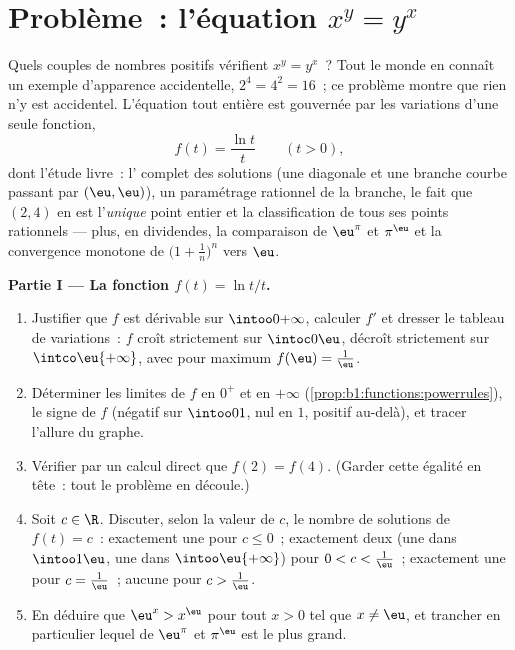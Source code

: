 \section{Problème~: l'équation $x^y = y^x$}

\begin{problem}\label{pb:b1:functions:1}
Quels couples de nombres positifs vérifient $x^y = y^x$~? Tout le
monde en connaît un exemple d'apparence accidentelle, $2^4 = 4^2 =
16$~; ce problème montre que rien n'y est accidentel. L'équation tout
entière est gouvernée par les variations d'une seule fonction,
\[
f(t) = \frac{\ln t}{t} \qquad (t > 0),
\]
dont l'étude livre~: l' complet des solutions (une diagonale
et une branche courbe passant par $(\eu, \eu)$), un paramétrage
rationnel de la branche, le fait que $(2, 4)$ en est l'\emph{unique}
point entier et la classification de tous ses points rationnels ---
plus, en dividendes, la comparaison de $\eu^\pi$ et $\pi^\eu$ et la
convergence monotone de $\bigl(1 + \frac1n\bigr)^n$ vers $\eu$.

\medskip
\noindent\textbf{Partie I --- La fonction $f(t) = \ln t / t$.}
\begin{enumerate}
  \item Justifier que $f$ est dérivable sur $\intoo0{+\infty}$,
        calculer $f'$ et dresser le tableau de variations~: $f$
        croît strictement sur $\intoc0\eu$, décroît strictement sur
        $\intco\eu{+\infty}$, avec pour maximum $f(\eu) = \frac1\eu$.
  \item Déterminer les limites de $f$ en $0^+$ et en $+\infty$
        (\cref{prop:b1:functions:powerrules}), le signe de $f$
        (négatif sur $\intoo01$, nul en $1$, positif au-delà), et
        tracer l'allure du graphe.
  \item Vérifier par un calcul direct que $f(2) = f(4)$. (Garder
        cette égalité en tête~: tout le problème en découle.)
  \item Soit $c \in \R$. Discuter, selon la valeur de $c$, le
        nombre de solutions de $f(t) = c$~: exactement une pour
        $c \leq 0$~; exactement deux (une dans $\intoo1\eu$, une
        dans $\intoo\eu{+\infty}$) pour $0 < c < \frac1\eu$~;
        exactement une pour $c = \frac1\eu$~; aucune pour
        $c > \frac1\eu$.
  \item En déduire que $\eu^x > x^\eu$ pour tout $x > 0$ tel que
        $x \neq \eu$, et trancher en particulier lequel de $\eu^\pi$
        et $\pi^\eu$ est le plus grand.
\end{enumerate}


\end{problem}
